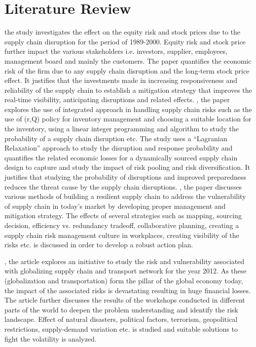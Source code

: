 \documentclass[conference]{IEEEtran}
\begin{document}
\section{Literature Review}
\cite{c4} the study investigates the effect on the equity risk and stock prices due to the supply chain disruption for the period of 1989-2000. Equity risk and stock price further impact the various stakeholders i.e. investors, supplier, employees, management board and mainly the customers. The paper quantifies the economic risk of the firm due to any supply chain disruption and the long-term stock price effect. It justifies that the investments made in increasing responsiveness and reliability of the supply chain to establish a mitigation strategy that improves the real-time visibility, anticipating disruptions and related effects.\newline
\cite{c5}, the paper explores the use of integrated approach in handling supply chain risks such as the use of (r,Q) policy for inventory management and choosing a suitable location for the inventory, using a linear integer programming and algorithm to study the probability of a supply chain disruption etc. The study uses a “Lagranian Relaxation” approach to study the disruption and response probability and quantifies the related economic losses for a dynamically sourced supply chain design to capture and study the impact of risk pooling and risk diversification. It justifies that studying the probability of disruptions and improved preparedness reduces the threat cause by the supply chain disruptions.\newline
\cite{c3}, the paper discusses various methods of building a resilient supply chain to address the vulnerability of supply chain in today’s market by developing proper management and mitigation strategy. The effects of several strategies such as mapping, sourcing decision, efficiency vs. redundancy tradeoff, collaborative planning, creating a supply chain risk management culture in workplaces, creating visibility of the risks etc. is discussed in order to develop a robust action plan.\newline

\cite{c8}, the article explores an initiative to study the risk and vulnerability associated with globalizing supply chain and transport network for the year 2012. As these (globalization and transportation) form the pillar of the global economy today, the impact of the associated risks is devastating resulting in huge financial losses. The article further discusses the results of the workshops conducted in different parts of the world to deepen the problem understanding and identify the risk landscape. Effect of natural disasters, political factors, terrorism, geopolitical restrictions, supply-demand variation etc. is studied and suitable solutions to fight the volatility is analyzed.
\end{document}
